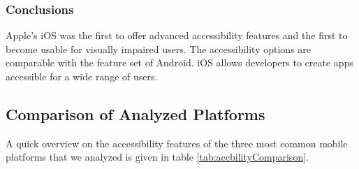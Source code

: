 \subsubsection{Conclusions}
Apple's iOS was the first to offer advanced accessibility features and the first to become usable for visually impaired users. The accessibility options are comparable with the  feature set of Android. iOS allows developers to create apps accessible for a wide range of users.

\subsection{Comparison of Analyzed Platforms}
A quick overview on the accessibility features of the three most common mobile platforms that we analyzed is given in table \ref{tab:accbilityComparison}.




